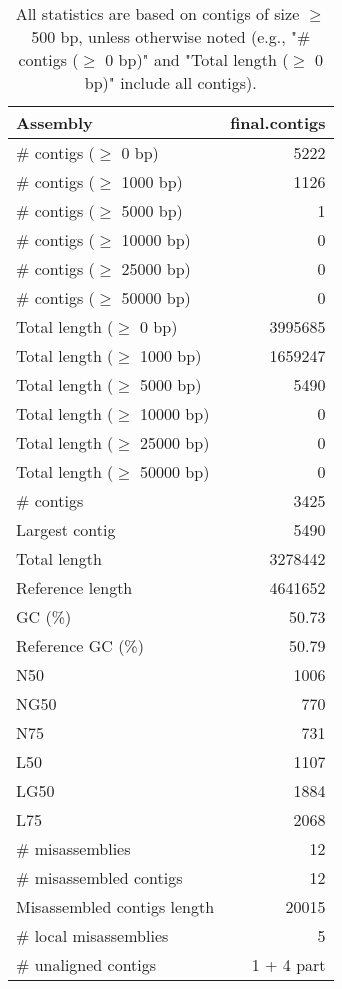 \documentclass[12pt,a4paper]{article}
\begin{document}
\begin{table}[ht]
\begin{center}
\caption{All statistics are based on contigs of size $\geq$ 500 bp, unless otherwise noted (e.g., "\# contigs ($\geq$ 0 bp)" and "Total length ($\geq$ 0 bp)" include all contigs).}
\begin{tabular}{|l*{1}{|r}|}
\hline
Assembly & final.contigs \\ \hline
\# contigs ($\geq$ 0 bp) & 5222 \\ \hline
\# contigs ($\geq$ 1000 bp) & 1126 \\ \hline
\# contigs ($\geq$ 5000 bp) & 1 \\ \hline
\# contigs ($\geq$ 10000 bp) & 0 \\ \hline
\# contigs ($\geq$ 25000 bp) & 0 \\ \hline
\# contigs ($\geq$ 50000 bp) & 0 \\ \hline
Total length ($\geq$ 0 bp) & 3995685 \\ \hline
Total length ($\geq$ 1000 bp) & 1659247 \\ \hline
Total length ($\geq$ 5000 bp) & 5490 \\ \hline
Total length ($\geq$ 10000 bp) & 0 \\ \hline
Total length ($\geq$ 25000 bp) & 0 \\ \hline
Total length ($\geq$ 50000 bp) & 0 \\ \hline
\# contigs & 3425 \\ \hline
Largest contig & 5490 \\ \hline
Total length & 3278442 \\ \hline
Reference length & 4641652 \\ \hline
GC (\%) & 50.73 \\ \hline
Reference GC (\%) & 50.79 \\ \hline
N50 & 1006 \\ \hline
NG50 & 770 \\ \hline
N75 & 731 \\ \hline
L50 & 1107 \\ \hline
LG50 & 1884 \\ \hline
L75 & 2068 \\ \hline
\# misassemblies & 12 \\ \hline
\# misassembled contigs & 12 \\ \hline
Misassembled contigs length & 20015 \\ \hline
\# local misassemblies & 5 \\ \hline
\# unaligned contigs & 1 + 4 part \\ \hline

\end{tabular}
\end{center}
\end{table}
\end{document}
